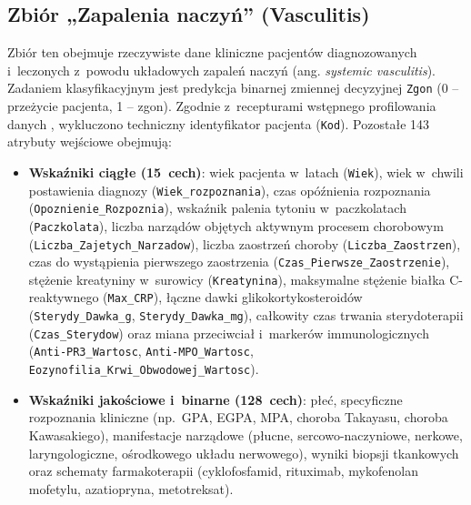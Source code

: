 \subsection{Zbiór „Zapalenia naczyń” (Vasculitis)}
Zbiór ten obejmuje rzeczywiste dane kliniczne pacjentów diagnozowanych i~leczonych z~powodu układowych zapaleń naczyń (ang. \textit{systemic vasculitis}). Zadaniem klasyfikacyjnym jest predykcja binarnej zmiennej decyzyjnej \texttt{Zgon} (0 – przeżycie pacjenta, 1 – zgon). Zgodnie z~recepturami wstępnego profilowania danych \cite{Walker2021}, wykluczono techniczny identyfikator pacjenta (\texttt{Kod}). Pozostałe 143 atrybuty wejściowe obejmują:
\begin{itemize}
    \item \textbf{Wskaźniki ciągłe (15~cech)}: wiek pacjenta w~latach (\texttt{Wiek}), wiek w~chwili postawienia diagnozy (\texttt{Wiek\_rozpoznania}), czas opóźnienia rozpoznania (\texttt{Opoznienie\_Rozpoznia}), wskaźnik palenia tytoniu w~paczkolatach (\texttt{Paczkolata}), liczba narządów objętych aktywnym procesem chorobowym (\texttt{Liczba\_Zajetych\_Narzadow}), liczba zaostrzeń choroby (\texttt{Liczba\_Zaostrzen}), czas do wystąpienia pierwszego zaostrzenia (\texttt{Czas\_Pierwsze\_Zaostrzenie}), stężenie kreatyniny w~surowicy (\texttt{Kreatynina}), maksymalne stężenie białka C-reaktywnego (\texttt{Max\_CRP}), łączne dawki glikokortykosteroidów (\texttt{Sterydy\_Dawka\_g}, \texttt{Sterydy\_Dawka\_mg}), całkowity czas trwania sterydoterapii (\texttt{Czas\_Sterydow}) oraz miana przeciwciał i~markerów immunologicznych (\texttt{Anti-PR3\_Wartosc}, \texttt{Anti-MPO\_Wartosc}, \texttt{Eozynofilia\_Krwi\_Obwodowej\_Wartosc}).
    \item \textbf{Wskaźniki jakościowe i~binarne (128~cech)}: płeć, specyficzne rozpoznania kliniczne (np.~GPA, EGPA, MPA, choroba Takayasu, choroba Kawasakiego), manifestacje narządowe (płucne, sercowo-naczyniowe, nerkowe, laryngologiczne, ośrodkowego układu nerwowego), wyniki biopsji tkankowych oraz schematy farmakoterapii (cyklofosfamid, rituximab, mykofenolan mofetylu, azatiopryna, metotreksat).
\end{itemize}

